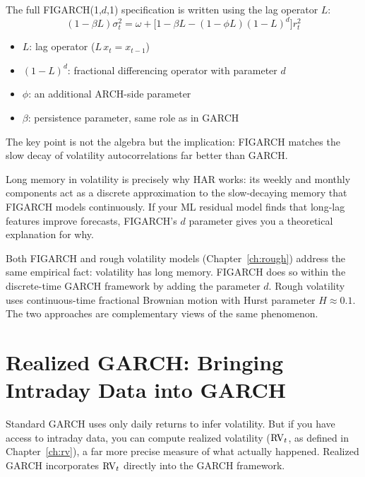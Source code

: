 The full FIGARCH(1,$d$,1) specification is written using the lag operator $L$:
%
\begin{equation}
\label{eq:figarch}
(1 - \beta L)\sigma^2_t
  = \omega + \bigl[1 - \beta L - (1 - \phi L)(1 - L)^d\bigr] r^2_t
\end{equation}
%
\begin{itemize}[nosep]
  \item $L$: lag operator ($L \, x_t = x_{t-1}$)
  \item $(1-L)^d$: fractional differencing operator with parameter $d$
  \item $\phi$: an additional ARCH-side parameter
  \item $\beta$: persistence parameter, same role as in GARCH
\end{itemize}

The key point is not the algebra but the implication: FIGARCH matches the slow decay
of volatility autocorrelations far better than GARCH.

\begin{projectconnection}
Long memory in volatility is precisely why HAR works: its weekly and monthly
components act as a discrete approximation to the slow-decaying memory that FIGARCH
models continuously. If your ML residual model finds that long-lag features improve
forecasts, FIGARCH's $d$ parameter gives you a theoretical explanation for why.
\end{projectconnection}

\begin{keyidea}
Both FIGARCH and rough volatility models (Chapter~\ref{ch:rough}) address the same
empirical fact: volatility has long memory. FIGARCH does so within the discrete-time
GARCH framework by adding the parameter $d$. Rough volatility uses continuous-time
fractional Brownian motion with Hurst parameter $H \approx 0.1$. The two approaches
are complementary views of the same phenomenon.
\end{keyidea}


\section{Realized GARCH: Bringing Intraday Data into GARCH}
\label{sec:realized-garch}

Standard GARCH uses only daily returns to infer volatility. But if you have access
to intraday data, you can compute realized volatility ($\operatorname{RV}_t$, as defined in
Chapter~\ref{ch:rv}), a far more precise measure of what actually happened. Realized
GARCH incorporates $\operatorname{RV}_t$ directly into the GARCH framework.

